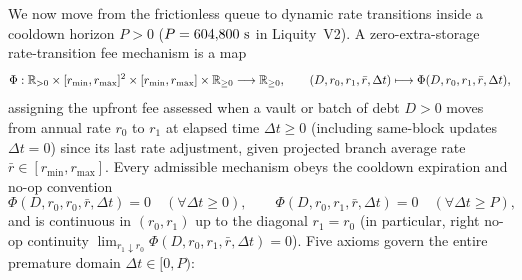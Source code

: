 We now move from the frictionless queue to dynamic rate transitions inside a cooldown horizon $P > 0$ ($P = 604{,}800\textup{ s}$ in Liquity~V2). A zero-extra-storage rate-transition fee mechanism is a map
\[
\Phi : \mathbb{R}_{>0} \times [r_{\min}, r_{\max}]^2 \times [r_{\min}, r_{\max}] \times \mathbb{R}_{\ge 0} \longrightarrow \mathbb{R}_{\ge 0}, \qquad (D, r_0, r_1, \bar{r}, \Delta t) \longmapsto \Phi(D, r_0, r_1, \bar{r}, \Delta t),
\]
assigning the upfront fee assessed when a vault or batch of debt $D > 0$ moves from annual rate $r_0$ to $r_1$ at elapsed time $\Delta t \ge 0$ (including same-block updates $\Delta t = 0$) since its last rate adjustment, given projected branch average rate $\bar{r} \in [r_{\min}, r_{\max}]$. Every admissible mechanism obeys the cooldown expiration and no-op convention
\begin{equation}\label{eq:convention}
\Phi(D, r_0, r_0, \bar{r}, \Delta t) = 0 \quad (\forall \Delta t \ge 0), \qquad \Phi(D, r_0, r_1, \bar{r}, \Delta t) = 0 \quad (\forall \Delta t \ge P),
\end{equation}
and is continuous in $(r_0, r_1)$ up to the diagonal $r_1 = r_0$ (in particular, right no-op continuity $\lim_{r_1 \downarrow r_0} \Phi(D, r_0, r_1, \bar{r}, \Delta t) = 0$). Five axioms govern the entire premature domain $\Delta t \in [0, P)$:
